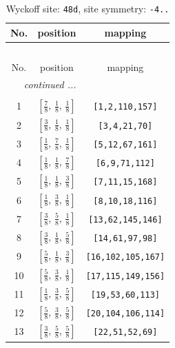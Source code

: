 \documentclass[fleqn,8pt]{jsarticle}
\begin{document}
\begin{longtable}{ccc}
\caption{Wyckoff site: {\tt 48d}, site symmetry: {\tt -4..}}
 \\
 \hline \hline
No. & position & mapping \\ \hline \endfirsthead

\multicolumn{2}{l}{\tablename\ \thetable{}} \\
 \hline \hline
No. & position & mapping \\ \hline \endhead

 \hline \hline
\multicolumn{2}{r}{\footnotesize\it continued ...} \\ \endfoot

 \hline \hline
\multicolumn{2}{r}{} \\ \endlastfoot

1 & $\left[ \frac{7}{8},\, \frac{1}{8},\, \frac{1}{8} \right]$ & {\tt [1,2,110,157]} \\ \hline
2 & $\left[ \frac{3}{8},\, \frac{1}{8},\, \frac{1}{8} \right]$ & {\tt [3,4,21,70]} \\ \hline
3 & $\left[ \frac{1}{8},\, \frac{7}{8},\, \frac{1}{8} \right]$ & {\tt [5,12,67,161]} \\ \hline
4 & $\left[ \frac{1}{8},\, \frac{1}{8},\, \frac{7}{8} \right]$ & {\tt [6,9,71,112]} \\ \hline
5 & $\left[ \frac{1}{8},\, \frac{1}{8},\, \frac{3}{8} \right]$ & {\tt [7,11,15,168]} \\ \hline
6 & $\left[ \frac{1}{8},\, \frac{3}{8},\, \frac{1}{8} \right]$ & {\tt [8,10,18,116]} \\ \hline
7 & $\left[ \frac{3}{8},\, \frac{5}{8},\, \frac{1}{8} \right]$ & {\tt [13,62,145,146]} \\ \hline
8 & $\left[ \frac{3}{8},\, \frac{1}{8},\, \frac{5}{8} \right]$ & {\tt [14,61,97,98]} \\ \hline
9 & $\left[ \frac{5}{8},\, \frac{1}{8},\, \frac{3}{8} \right]$ & {\tt [16,102,105,167]} \\ \hline
10 & $\left[ \frac{5}{8},\, \frac{3}{8},\, \frac{1}{8} \right]$ & {\tt [17,115,149,156]} \\ \hline
11 & $\left[ \frac{1}{8},\, \frac{3}{8},\, \frac{5}{8} \right]$ & {\tt [19,53,60,113]} \\ \hline
12 & $\left[ \frac{5}{8},\, \frac{3}{8},\, \frac{5}{8} \right]$ & {\tt [20,104,106,114]} \\ \hline
13 & $\left[ \frac{3}{8},\, \frac{5}{8},\, \frac{5}{8} \right]$ & {\tt [22,51,52,69]} \\ \hline

\end{longtable}
\end{document}
